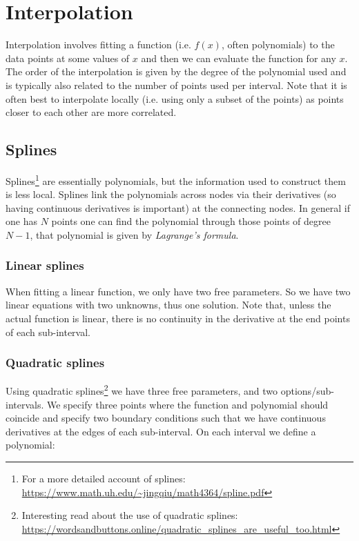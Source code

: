 \documentclass[a4paper]{article}
\begin{document}
\section{Interpolation}

Interpolation involves fitting a function (i.e. $f(x)$, often polynomials) to the data points at some values of $x$ and then we can evaluate the function for any $x$. The order of the interpolation is given by the degree of the polynomial used and is typically also related to the number of points used per interval. Note that it is often best to interpolate locally (i.e. using only a subset of the points) as points closer to each other are more correlated.

\subsection{Splines}

Splines\footnote{For a more detailed account of splines: \url{https://www.math.uh.edu/~jingqiu/math4364/spline.pdf}} are essentially polynomials, but the information used to construct them is less local. Splines link the polynomials across nodes via their derivatives (so having continuous derivatives is important) at the connecting nodes. In general if one has $N$ points one can find the polynomial through those points of degree $N-1$, that polynomial is given by \textit{Lagrange's formula}.

\subsubsection{Linear splines}

When fitting a linear function, we only have two free parameters. So we have two linear equations with two unknowns, thus one solution. Note that, unless the actual function is linear, there is no continuity in the derivative at the end points of each sub-interval.

\subsubsection{Quadratic splines}

Using quadratic splines\footnote{Interesting read about the use of quadratic splines: \url{https://wordsandbuttons.online/quadratic_splines_are_useful_too.html}} we have three free parameters, and two options/sub-intervals. We specify three points where the function and polynomial should coincide and specify two boundary conditions such that we have continuous derivatives at the edges of each sub-interval. On each interval we define a polynomial:
\end{document}
